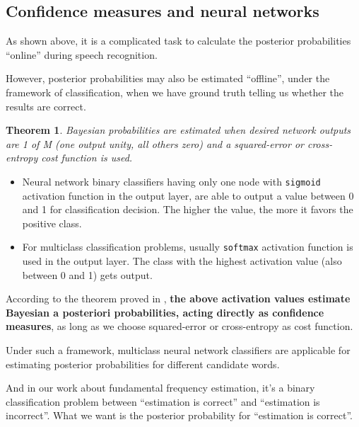 \documentclass[11pt,a4paper]{report}
\newtheorem*{theorem}{Theorem}
\begin{document}
\subsection{Confidence measures and neural networks}

As shown above, it is a complicated task to calculate the posterior probabilities \enquote{online} during speech recognition.

However, posterior probabilities may also be estimated \enquote{offline}, under the framework of classification, when we have ground truth telling us whether the results are correct.

\bigskip

\begin{mdframed}
\begin{theorem}
  Bayesian probabilities are estimated when desired network outputs are 1 of M (one output unity, all others zero) and a squared-error or cross-entropy cost function is used. \parencite{richard1991neural}
\end{theorem}
\end{mdframed}

\begin{itemize}
  \item Neural network binary classifiers having only one node with \texttt{sigmoid} activation function in the output layer, are able to output a value between 0 and 1 for classification decision.
    The higher the value, the more it favors the positive class.
  \item For multiclass classification problems, usually \texttt{softmax} activation function is used in the output layer.
    The class with the highest activation value (also between 0 and 1) gets output.
\end{itemize}

According to the theorem proved in \parencite{richard1991neural}, \textbf{the above activation values estimate Bayesian a posteriori probabilities, acting directly as confidence measures}, as long as we choose squared-error or cross-entropy as cost function.

\bigskip

Under such a framework, multiclass neural network classifiers are applicable for estimating posterior probabilities for different candidate words.

And in our work about fundamental frequency estimation, it's a binary classification problem between \enquote{estimation is correct} and \enquote{estimation is incorrect}.
What we want is the posterior probability for \enquote{estimation is correct}.
\end{document}
